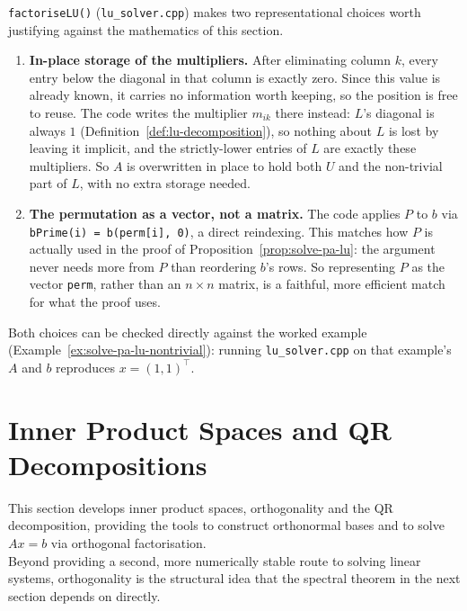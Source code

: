 	\begin{compremark}
		\texttt{factoriseLU()} (\texttt{lu\_solver.cpp}) makes two representational choices worth justifying against the mathematics of this section.

		\begin{enumerate}[label=\roman*.]
			\item \textbf{In-place storage of the multipliers.} After eliminating column $k$, every entry below the diagonal in that column is exactly zero. Since this value is already known, it carries no information worth keeping, so the position is free to reuse. The code writes the multiplier $m_{ik}$ there instead: $L$'s diagonal is always $1$ (Definition~\ref{def:lu-decomposition}), so nothing about $L$ is lost by leaving it implicit, and the strictly-lower entries of $L$ are exactly these multipliers. So $A$ is overwritten in place to hold both $U$ and the non-trivial part of $L$, with no extra storage needed.
			\item \textbf{The permutation as a vector, not a matrix.} The code applies $P$ to $b$ via \texttt{bPrime(i) = b(perm[i], 0)}, a direct reindexing. This matches how $P$ is actually used in the proof of Proposition~\ref{prop:solve-pa-lu}: the argument never needs more from $P$ than reordering $b$'s rows. So representing $P$ as the vector \texttt{perm}, rather than an $n\times n$ matrix, is a faithful, more efficient match for what the proof uses.
		\end{enumerate}
		
		Both choices can be checked directly against the worked example (Example~\ref{ex:solve-pa-lu-nontrivial}): running \texttt{lu\_solver.cpp} on that example's $A$ and $b$ reproduces $x = (1,1)^\top$.
	\end{compremark}
	
\section{Inner Product Spaces and QR Decompositions}
\label{sec:inner-products}
	
	This section develops inner product spaces, orthogonality and the QR decomposition, providing the tools to construct orthonormal bases and to solve $Ax = b$ via orthogonal factorisation. \\
	
	Beyond providing a second, more numerically stable route to solving linear systems, orthogonality is the structural idea that the spectral theorem in the next section depends on directly. \\
	
